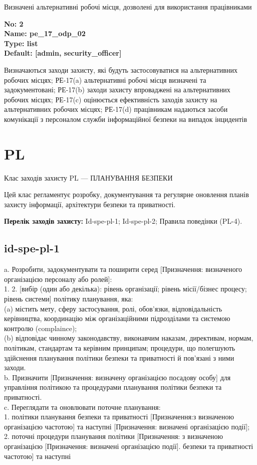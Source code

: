 \documentclass{article}
\begin{document}
{\footnotesize Визначені альтернативні робочі місця, дозволені для використання працівниками}


{\footnotesize\bfseries
No: 2\\
Name: pe\_\allowbreak{}17\_\allowbreak{}odp\_\allowbreak{}02\\
Type: list\\
Default: [\textquotedbl{}admin\textquotedbl{}, \textquotedbl{}security\_\allowbreak{}officer\textquotedbl{}]
}

{\footnotesize Визначаються заходи захисту, які будуть застосовуватися на альтернативних робочих місцях; РЕ-17(a) альтернативні робочі місця визначені та задокументовані; РЕ-17(b) заходи захисту впроваджені на альтернативних робочих місцях; РЕ-17(c) оцінюється ефективність заходів захисту на альтернативних робочих місцях; РЕ-17(d) працівникам надаються засоби комунікації з персоналом служби інформаційної безпеки на випадок інцидентів}




\section{PL}
Клас заходів захисту PL --- ПЛАНУВАННЯ БЕЗПЕКИ

Цей клас регламентує розробку, документування та регулярне оновлення планів захисту інформації, архітектури безпеки та приватності.

\textbf{Перелік заходів захисту:} Id-spe-pl-1; Id-spe-pl-2; Правила поведінки (PL-4).

\subsection{id-spe-pl-1}
a. Розробити, задокументувати та поширити серед [Призначення: визначеного організацією персоналу або ролей]:\\ 
1. 2. [вибір (один або декілька): рівень організації; рівень місії/бізнес процесу; рівень системи] політику планування, яка:\\ 
(a) містить мету, сферу застосування, ролі, обов'язки, відповідальність керівництва, координацію між організаційними підрозділами та системою контролю (complaince);\\ 
(b) відповідає чинному законодавству, виконавчим наказам, директивам, нормам, політикам, стандартам та керівним принципам; процедури, що полегшують здійснення планування політики безпеки та приватності й пов'язані з ними заходи.\\ 
b. Призначити [Призначення: визначену організацією посадову особу] для управління політикою та процедурами планування політики безпеки та приватності.\\ 
c. Переглядати та оновлювати поточне планування:\\ 
1. політики планування безпеки та приватності [Призначення:з визначеною організацією частотою] та наступні [Призначення: визначені організацією події];\\ 
2. поточні процедури планування політики [Призначення: з визначеною організацією [Призначення: визначені організацією події]. безпеки та приватності частотою] та наступні
\end{document}
